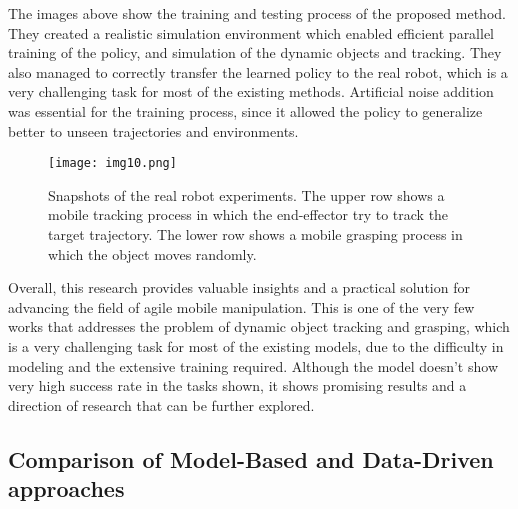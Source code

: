 The images above show the training and testing process of the proposed method. They created a
realistic simulation environment which enabled efficient parallel training of the policy,
and simulation of the dynamic objects and tracking. They also managed to correctly transfer the
learned policy to the real robot, which is a very challenging task for most of the existing methods.
Artificial noise addition was essential for the training process, since it allowed the policy
to generalize better to unseen trajectories and environments.

\begin{figure}[H]
	\centering
	\texttt{[image: img10.png]}
	\captionsetup{width=1\linewidth}
	\caption{Snapshots of the real robot experiments. The upper row shows a mobile
	tracking process in which the end-effector try to track the target trajectory.
	The lower row shows a mobile grasping process in which the object moves
	randomly. \cite{wang2022multitask}}
	\label{fig:img10}
\end{figure}

Overall, this research provides valuable insights and a practical solution for advancing the
field of agile mobile manipulation. This is one of the very few works that addresses the
problem of dynamic object tracking and grasping, which is a very challenging task for most
of the existing models, due to the difficulty in modeling and the extensive training required. Although
the model doesn't show very high success rate in the tasks shown, it shows promising results
and a direction of research that can be further explored.



\subsection{Comparison of Model-Based and Data-Driven approaches}


